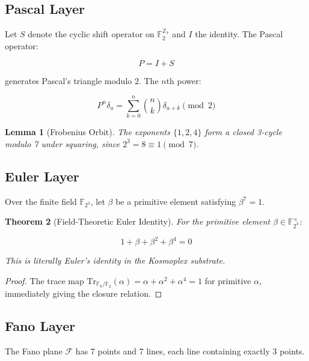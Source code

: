 \documentclass[pdflatex,sn-mathphys-num]{sn-jnl}
\theoremstyle{thmstyleone}
\newtheorem{theorem}{Theorem}
\newtheorem{lemma}[theorem]{Lemma}
\theoremstyle{thmstyletwo}
\theoremstyle{thmstylethree}
\begin{document}
\subsection{Pascal Layer}\label{subsec:s1-pascal}
Let $S$ denote the cyclic shift operator on $\mathbb{F}_2^{\mathbb{Z}_7}$ and $I$ the identity. The Pascal operator:

\begin{equation}
P = I + S
\end{equation}

generates Pascal's triangle modulo 2. The $n$th power:

\begin{equation}
P^n\delta_a = \sum_{k=0}^n \binom{n}{k}\delta_{a+k} \pmod{2}
\end{equation}

\begin{lemma}[Frobenius Orbit]\label{lem:s1-frobenius}
The exponents $\{1,2,4\}$ form a closed 3-cycle modulo 7 under squaring, since $2^3 = 8 \equiv 1 \pmod{7}$.
\end{lemma}

\subsection{Euler Layer}\label{subsec:s1-euler}
Over the finite field $\mathbb{F}_{2^3}$, let $\beta$ be a primitive element satisfying $\beta^7 = 1$.


\begin{theorem}[Field-Theoretic Euler Identity]\label{thm:s1-euler}
For the primitive element $\beta \in \mathbb{F}_{2^3}^{\times}$:

\begin{equation}
1 + \beta + \beta^2 + \beta^4 = 0
\end{equation}

This is literally Euler's identity in the Kosmoplex substrate.
\end{theorem}

\begin{proof}
The trace map $\text{Tr}_{\mathbb{F}_8/\mathbb{F}_2}(\alpha) = \alpha + \alpha^2 + \alpha^4 = 1$ for primitive $\alpha$, immediately giving the closure relation.
\end{proof}

\subsection{Fano Layer}\label{subsec:s1-fano}
The Fano plane $\mathcal{F}$ has 7 points and 7 lines, each line containing exactly 3 points.
\end{document}
